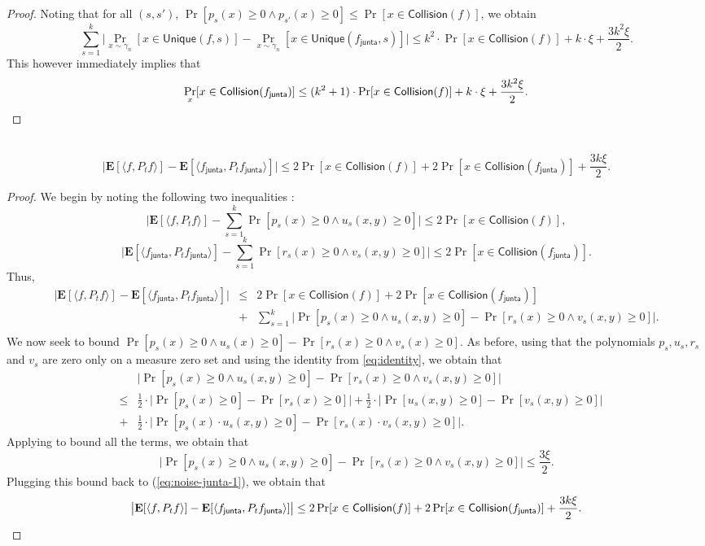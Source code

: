 \documentclass{toc}
\newcommand{\fh}{{f_{\mathsf{junta}}}}
\begin{document}
\begin{proof}
Noting that for all $(s,s')$, $\Pr [p_s(x) \ge 0 \wedge p_{s'}(x) \ge 0] \le \Pr [x \in \mathsf{Collision}(f)]$, we obtain
\[
\sum_{s=1}^k \big|\Pr_{x \sim \gamma_n} [x \in \mathsf{Unique}(f,s)]- \Pr_{x \sim \gamma_n} [x \in \mathsf{Unique}(\fh,s)] \big| \le k^2 \cdot \Pr[x \in \mathsf{Collision}(f)] + k \cdot \xi + \frac{3k^2 \xi}{2}. 
\]
This however immediately implies that 
\[
\Pr_x [x \in \mathsf{Collision}(\fh)] \le  (k^2+1) \cdot \Pr[x \in \mathsf{Collision}(f)] + k \cdot \xi + \frac{3k^2 \xi}{2}. 
\qedhere
\]
\end{proof}

\begin{lemma}~\label{lem:noise-stab}
\[
\big| \mathbf{E}[\langle f, P_t f \rangle]  - \mathbf{E}[\langle \fh, P_t \fh \rangle]\big| \le 2\Pr[x \in \mathsf{Collision}(f)] +2 \Pr[x \in \mathsf{Collision}(\fh)] + \frac{3k\xi}{2}. 
\]
\end{lemma}
\begin{proof}
We begin by noting the following two inequalities :
\[
\big| \mathbf{E}[\langle f, P_t f \rangle]  -\sum_{s=1}^k \Pr[p_s(x) \ge 0 \wedge u_s(x,y) \ge 0] \big| \le 2 \Pr[x \in \mathsf{Collision}(f)],
\]
\[
\big| \mathbf{E}[\langle \fh, P_t \fh \rangle]  -\sum_{s=1}^k \Pr[r_s(x) \ge 0 \wedge v_s(x,y) \ge 0] \big| \le 2 \Pr[x \in \mathsf{Collision}(\fh)].
\]
Thus, 
\begin{eqnarray}
\big| \mathbf{E}[\langle f, P_t f \rangle] - \mathbf{E}[\langle \fh, P_t \fh \rangle] \big| &\le& 2\Pr[x \in \mathsf{Collision}(f)] +2 \Pr[x \in \mathsf{Collision}(\fh)] \nonumber \\ 
&+& \sum_{s=1}^k \big|\Pr[p_s(x) \ge 0 \wedge u_s(x,y) \ge 0]- \Pr[r_s(x) \ge 0 \wedge v_s(x,y) \ge 0] \big|. \nonumber \\ \label{eq:noise-junta-1}
\end{eqnarray}
We now seek to bound $\Pr[p_s(x) \ge 0 \wedge u_s(x) \ge 0]- \Pr[r_s(x) \ge 0 \wedge v_s(x) \ge 0]$. As before, using that the polynomials $p_s, u_s, r_s$ and $v_s$ are zero only
on a measure zero set and using the identity from \eqref{eq:identity}, we obtain that 
\begin{eqnarray*}
&& \big|\Pr[p_s(x) \ge 0 \wedge u_s(x,y) \ge 0]- \Pr[r_s(x) \ge 0 \wedge v_s(x,y) \ge 0] \big| \\ &\le& \frac{1}{2} \cdot  \big|\Pr[p_s(x) \ge 0]- \Pr[r_s(x) \ge 0] \big| +  \frac{1}{2} \cdot  \big|\Pr[u_s(x,y) \ge 0]- \Pr[v_s(x,y) \ge 0] \big|  \\ &+&  \frac{1}{2} \cdot  \big|\Pr[p_s(x) \cdot u_s(x,y) \ge 0]- \Pr[r_s(x) \cdot v_s(x,y) \ge 0] \big|.
\end{eqnarray*} 
Applying  to bound all the terms, we obtain that 
$$
 \big|\Pr[p_s(x) \ge 0 \wedge u_s(x,y) \ge 0]- \Pr[r_s(x) \ge 0 \wedge v_s(x,y) \ge 0] \big| \le \frac{3 \xi}{2}. 
$$
Plugging this bound back to (\ref{eq:noise-junta-1}), we obtain that 
\[
\big| \mathbf{E}[\langle f, P_t f \rangle] - \mathbf{E}[\langle \fh, P_t \fh \rangle] \big| \le   2\Pr[x \in \mathsf{Collision}(f)] +2 \Pr[x \in \mathsf{Collision}(\fh)] + \frac{3k\xi}{2}. 
\qedhere
\]
\end{proof}
\end{document}
